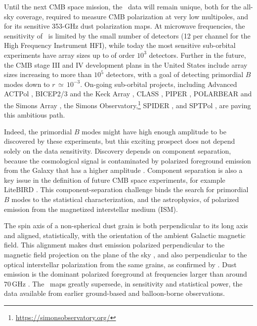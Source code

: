 \documentclass[longauth,traditabstract]{aa}
\newcommand{\HFI}{HFI}
\begin{document}
Until the next CMB space mission, the \Planck\ data will remain unique, both for the all-sky coverage, required to measure 
CMB polarization at very low multipoles, and for its sensitive 353-GHz dust polarization maps.
At microwave frequencies, the sensitivity of \Planck\ is limited by the small number of detectors (12 per channel for the High Frequency Instrument \HFI), while 
today the most sensitive sub-orbital experiments have array sizes up to of
order $10^3$ detectors.
Further in the future, the CMB stage III and IV development plans in the United States
include array sizes increasing to more than $10^5$ detectors,
with a goal of detecting primordial $B$ modes down to $r\,{\simeq}\,10^{-3}$. 
On-going sub-orbital projects, including Advanced ACTPol \citep{Naess14}, BICEP2/3 and the Keck Array \citep{Grayson16}, CLASS \citep{Essinger-Hileman14}, 
PIPER \citep{Kogut11}, POLARBEAR and the Simons Array \citep{Arnold14}, the Simons Observatory,\footnote{\url{https://simonsobservatory.org/}} SPIDER \citep{Fraisse13}, and SPTPol \citep{Austermann12},
are paving this ambitious path. 

Indeed, the primordial $B$ modes might have high enough amplitude to be discovered by these experiments, but this exciting prospect does not depend solely on the data sensitivity. Discovery
depends on component separation, because
the cosmological signal is contaminated by polarized foreground emission from the Galaxy that has a higher amplitude \citep{Dunkley09,pb2015,Errard16,Hensley17,Remazeilles17}.
Component separation is also a key issue in the definition of future CMB space experiments, for example LiteBIRD \citep{Ishino16}.
This component-separation challenge binds the search for primordial $B$ modes to the statistical characterization, and the astrophysics, of polarized emission
from the magnetized interstellar medium (ISM). 

The spin axis of a non-spherical dust grain is both perpendicular to its long axis and aligned, statistically, with the orientation of the ambient Galactic magnetic field.
This alignment makes dust emission polarized perpendicular to the magnetic field projection on the plane of the sky \citep{Stein66,Hildebrand88,Martin07}, and also perpendicular to the optical interstellar polarization from the same grains, as confirmed by \citet{planck2014-XXI}.
Dust emission is the dominant polarized foreground at frequencies larger than around $70\,$GHz \citep{Dunkley09,planck2014-a12}. 
The \Planck\ maps greatly supersede, in sensitivity and statistical power, the data available from earlier ground-based and balloon-borne observations. 
\end{document}
